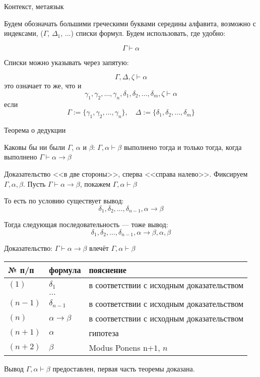 \documentclass[aspectratio=169]{beamer}
\begin{document}
\begin{frame}{Контекст, метаязык}

Будем обозначать большими греческими буквами середины
алфавита, возможно с индексами, ($\Gamma$, $\Delta_1$, ...) списки формул.
Будем использовать, где удобно:

$$\Gamma \vdash \alpha$$\pause

Списки можно указывать через запятую:

$$\Gamma, \Delta, \zeta \vdash \alpha$$\pause
это означает то же, что и 
$$\gamma_1,\gamma_2,\dots,\gamma_n,\delta_1,\delta_2,\dots,\delta_m,\zeta\vdash\alpha$$
если 
$$\Gamma := \{\gamma_1,\gamma_2,\dots,\gamma_n\},\quad \Delta := \{\delta_1,\delta_2,\dots,\delta_m\}$$

\end{frame}

\begin{frame}{Теорема о дедукции}

\begin{theorem}
Каковы бы ни были $\Gamma$, $\alpha$ и $\beta$:
$\Gamma,\alpha\vdash\beta$ выполнено тогда и только тогда, когда выполнено $\Gamma\vdash\alpha\rightarrow\beta$
\end{theorem}\pause

\vspace{0.5cm}
Доказательство <<в две стороны>>, сперва <<справа налево>>.
Фиксируем $\Gamma,\alpha,\beta$.
Пусть $\Gamma\vdash\alpha\rightarrow\beta$, покажем $\Gamma,\alpha\vdash\beta$\pause\vspace{0.5cm}

То есть по условию существует вывод: $$\delta_1, \delta_2, \dots, \delta_{n-1}, \alpha\rightarrow\beta$$\pause

Тогда следующая последовательность --- тоже вывод: 
$$\delta_1, \delta_2, \dots, \delta_{n-1}, \alpha\rightarrow\beta, \alpha, \beta$$


\end{frame}

\begin{frame}{Доказательство: $\Gamma\vdash\alpha\rightarrow\beta$ влечёт $\Gamma,\alpha\vdash\beta$}
\begin{tabular}{lll}
№ п/п & формула & пояснение\\
\hline
$(1)$ & $\delta_1$ & в соответствии с исходным доказательством\\
    & $\dots$ \\
$(n-1)$ & $\delta_{n-1}$ & в соответствии с исходным доказательством\\
$(n)$ & $\alpha\rightarrow\beta $ & в соответствии с исходным доказательством\\
$(n+1)$ & $\alpha$ & гипотеза\\
$(n+2)$ & $\beta$ & Modus Ponens n$+1$, $n$
\end{tabular}\pause\vspace{1cm}

Вывод $\Gamma,\alpha\vdash\beta$ предоставлен, первая часть теоремы доказана.
\end{frame}
\end{document}
